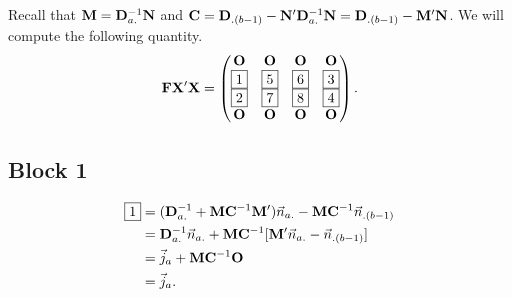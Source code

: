 Recall that $ \mathbf{M}=\mathbf{D}_{a.}^{-1}\mathbf{N} $ and $ \mathbf{C}=\mathbf{D}_{.(b-1)}-\mathbf{N}'\mathbf{D}_{a.}^{-1}\mathbf{N}=\mathbf{D}_{.(b-1)}-\mathbf{M}'\mathbf{N} $.
We will compute the following quantity.
\[ \mathbf{F}\mathbf{X}'\mathbf{X}
    =\begin{pmatrix}
        \mathbf{O} & \mathbf{O} & \mathbf{O} & \mathbf{O} \\
        \boxed{1}  & \boxed{5}  & \boxed{6}  & \boxed{3}  \\
        \boxed{2}  & \boxed{7}  & \boxed{8}  & \boxed{4}  \\
        \mathbf{O} & \mathbf{O} & \mathbf{O} & \mathbf{O}
    \end{pmatrix}. \]
\subsection*{Block 1}
\begin{align*}
    \boxed{1}
     & =(\mathbf{D}_{a.}^{-1}+\mathbf{M}\mathbf{C}^{-1}\mathbf{M}')\vec{n}_{a.}-\mathbf{M}\mathbf{C}^{-1}\vec{n}_{.(b-1)} \\
     & =\mathbf{D}_{a.}^{-1}\vec{n}_{a.}+\mathbf{M}\mathbf{C}^{-1}[\mathbf{M}'\vec{n}_{a.}-\vec{n}_{.(b-1)}]           \\
     & =\vec{j}_a+\mathbf{M}\mathbf{C}^{-1}\mathbf{O}                                                                        \\
     & =\vec{j}_a.
\end{align*}
